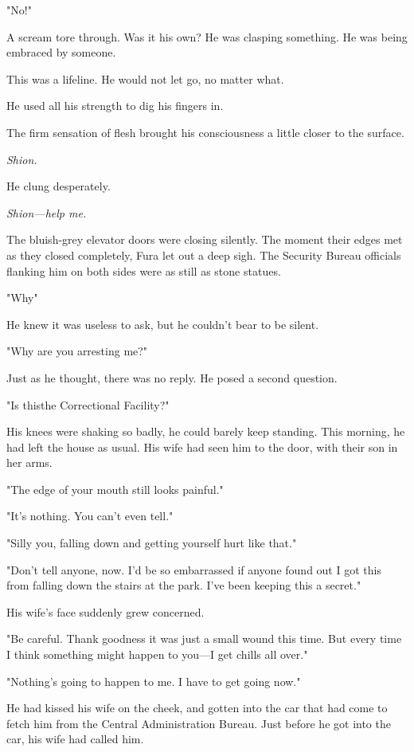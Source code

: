 "No!"

A scream tore through. Was it his own? He was clasping something. He was
being embraced by someone.

This was a lifeline. He would not let go, no matter what.

He used all his strength to dig his fingers in.

The firm sensation of flesh brought his consciousness a little closer to
the surface.

\emph{Shion.}

He clung desperately.

\emph{Shion---help me.}

\mybreak

The bluish-grey elevator doors were closing silently. The moment their
edges met as they closed completely, Fura let out a deep sigh. The
Security Bureau officials flanking him on both sides were as still as
stone statues.

"Why\el "

He knew it was useless to ask, but he couldn't bear to be silent.

"Why are you arresting me?"

Just as he thought, there was no reply. He posed a second question.

"Is this\el the Correctional Facility?"

His knees were shaking so badly, he could barely keep standing. This
morning, he had left the house as usual. His wife had seen him to the
door, with their son in her arms.

"The edge of your mouth still looks painful."

"It's nothing. You can't even tell."

"Silly you, falling down and getting yourself hurt like that."

"Don't tell anyone, now. I'd be so embarrassed if anyone found out I got
this from falling down the stairs at the park. I've been keeping this a
secret."

His wife's face suddenly grew concerned.

"Be careful. Thank goodness it was just a small wound this time. But
every time I think something might happen to you---I get chills all over."

"Nothing's going to happen to me. I have to get going now."

He had kissed his wife on the cheek, and gotten into the car that had
come to fetch him from the Central Administration Bureau. Just before he
got into the car, his wife had called him.

